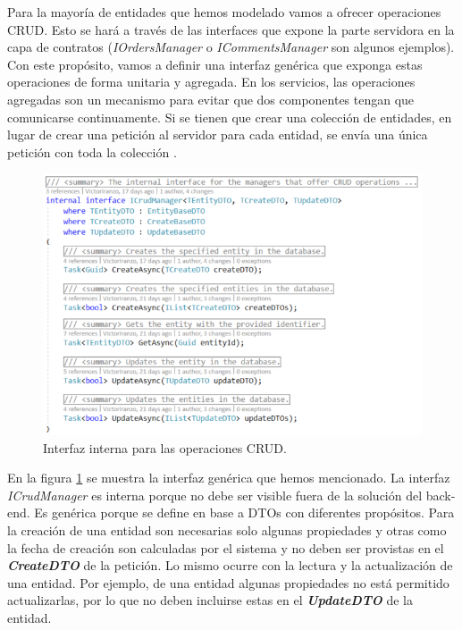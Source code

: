 \documentclass[11pt,spanish,listoffigures]{tfgetsinf}
\begin{document}
Para la mayoría de entidades que hemos modelado vamos a ofrecer operaciones CRUD. Esto se hará a través de las interfaces que expone la parte servidora en la capa de contratos (\textit{IOrdersManager} o \textit{ICommentsManager} son algunos ejemplos). Con este propósito, vamos a definir una interfaz genérica que exponga estas operaciones de forma unitaria y agregada. En los servicios, las operaciones agregadas son un mecanismo para evitar que dos componentes tengan que comunicarse continuamente. Si se tienen que crear una colección de entidades, en lugar de crear una petición al servidor para cada entidad, se envía una única petición con toda la colección \cite{Newman2015a}.

\begin{figure}[h]
\centering
\includegraphics[scale=0.8]{ICrudManager}
\caption{Interfaz interna para las operaciones CRUD.}
\label{fig:ICrudManager}
\end{figure}

En la figura \ref{fig:ICrudManager} se muestra la interfaz genérica que hemos mencionado. La interfaz \textit{ICrudManager} es interna porque no debe ser visible fuera de la solución del back-end. Es genérica porque se define en base a DTOs con diferentes propósitos. Para la creación de una entidad son necesarias solo algunas propiedades y otras como la fecha de creación son calculadas por el sistema y no deben ser provistas en el \textbf{\textit{CreateDTO}} de la petición. Lo mismo ocurre con la lectura y la actualización de una entidad. Por ejemplo, de una entidad algunas propiedades no está permitido actualizarlas, por lo que no deben incluirse estas en el \textbf{\textit{UpdateDTO}} de la entidad. 
\end{document}
